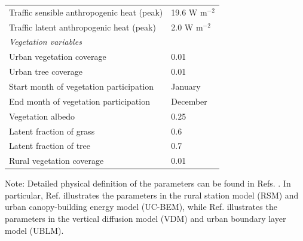 \begin{table}[]
\begin{center}
\begin{tabular}{ll}
\hspace{12pt}Traffic sensible anthropogenic heat (peak)   & 19.6 W m$^{-2}$              \\
\hspace{12pt}Traffic latent anthropogenic heat (peak) \vspace{6pt}    & 2.0 W m$^{-2}$               \\
\vspace{6pt}\textit{Vegetation variables}                &                         \\
\hspace{12pt}Urban vegetation coverage                    & 0.01                    \\
\hspace{12pt}Urban tree coverage                          & 0.01                    \\
\hspace{12pt}Start month of vegetation participation      & January                 \\
\hspace{12pt}End month of vegetation participation        & December                \\
\hspace{12pt}Vegetation albedo                            & 0.25                    \\
\hspace{12pt}Latent fraction of grass                     & 0.6                     \\
\hspace{12pt}Latent fraction of tree                      & 0.7                     \\
\hspace{12pt}Rural vegetation coverage                    & 0.01                    \\
\bottomrule
\end{tabular}
\end{center}
Note: Detailed physical definition of the parameters can be found in Refs. \cite{bueno2013urban,bueno2013calculation}. In particular, Ref. \cite{bueno2013urban} illustrates the parameters in the rural station model (RSM) and urban canopy-building energy model (UC-BEM), while Ref. \cite{bueno2013calculation} illustrates the parameters in the vertical diffusion model (VDM) and urban boundary layer model (UBLM).
\end{table}


